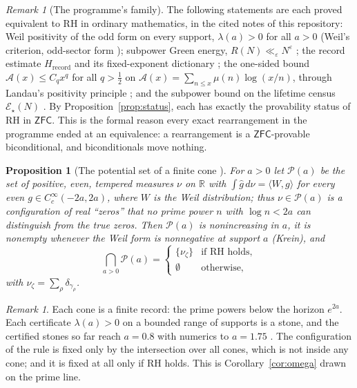 \documentclass[11pt]{article}
\newtheorem{proposition}[theorem]{Proposition}
\theoremstyle{definition}
\theoremstyle{remark}
\newtheorem{remark}[theorem]{Remark}
\newcommand{\R}{\mathbb R}
\newcommand{\ZFC}{\mathsf{ZFC}}
\newcommand{\RH}{\mathrm{RH}}
\begin{document}
\begin{remark}[The programme's family]
The following statements are each proved equivalent to $\RH$ in ordinary mathematics, in the cited notes of this repository: Weil positivity of the odd form on every support, $\lambda(a)>0$ for all $a>0$ (Weil's criterion, odd-sector form \cite{Weil}); subpower Green energy, $R(N)\ll_\varepsilon N^\varepsilon$ \cite[\S12]{MM2}; the record estimate $H_{\mathrm{record}}$ and its fixed-exponent dictionary \cite[Theorems 3.1, 3.2]{Hrec}; the one-sided bound $\mathcal A(x)\le C_qx^q$ for all $q>\frac12$ on $\mathcal A(x)=\sum_{n\le x}\mu(n)\log(x/n)$, through Landau's positivity principle \cite[\S\S26, 62]{Census}; and the subpower bound on the lifetime census $\mathcal E_\star(N)$ \cite[\S\S3--4]{Census}. By Proposition~\ref{prop:status}, each has exactly the provability status of $\RH$ in $\ZFC$. This is the formal reason every exact rearrangement in the programme ended at an equivalence: a rearrangement is a $\ZFC$-provable biconditional, and biconditionals move nothing.
\end{remark}

\begin{proposition}[The potential set of a finite cone \cite{Potential}]\label{prop:potential}
For $a>0$ let $\mathcal P(a)$ be the set of positive, even, tempered measures $\nu$ on $\R$ with $\int\widehat g\,d\nu=\langle W,g\rangle$ for every even $g\in C_c^\infty(-2a,2a)$, where $W$ is the Weil distribution; thus $\nu\in\mathcal P(a)$ is a configuration of real ``zeros'' that no prime power $n$ with $\log n<2a$ can distinguish from the true zeros. Then $\mathcal P(a)$ is nonincreasing in $a$, it is nonempty whenever the Weil form is nonnegative at support $a$ (Krein), and
\[
\bigcap_{a>0}\mathcal P(a)=\begin{cases}\{\nu_\zeta\}&\text{if }\RH\text{ holds},\\ \emptyset&\text{otherwise,}\end{cases}
\]
with $\nu_\zeta=\sum_\rho\delta_{\gamma_\rho}$.
\end{proposition}

\begin{remark}
Each cone is a finite record: the prime powers below the horizon $e^{2a}$. Each certificate $\lambda(a)>0$ on a bounded range of supports is a stone, and the certified stones so far reach $a=0.8$ \cite{Zhu} with numerics to $a=1.75$ \cite{Folds}. The configuration of the rule is fixed only by the intersection over all cones, which is not inside any cone; and it is fixed at all only if $\RH$ holds. This is Corollary~\ref{cor:omega} drawn on the prime line.
\end{remark}
\end{document}
